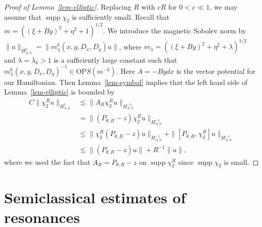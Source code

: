 \documentclass{article}
\theoremstyle{plain}
\theoremstyle{definition}
\theoremstyle{remark}
\newcommand{\supp}{\mathop{\mathrm{supp}}}
\begin{document}
\begin{proof}[Proof of Lemma~\ref{lem-elliptic}]
Replacing $R$ with $cR$ for $0<c\ll 1$, we may assume that $\supp \chi_2$ is sufficiently small. 
Recall that $m=((\xi+By)^2+\eta^2+1)^{1/2}$. 
We introduce the magnetic Sobolev norm by $\|u\|_{H_{A, h}^k}=\|m_{\lambda}^k(x, y, D_x, D_y)u\|$, where 
$m_{\lambda}=((\xi+By)^2+\eta^2+\lambda)^{1/2}$ and $\lambda=\lambda_k>1$ is a sufficiently large constant such that 
$m_{\lambda}^k(x, y, D_x, D_y)^{-1}\in \mathrm{OP}S(m^{-k})$. 
Here $A=-Bydx$ is the vector potential for our Hamiltonian.
Then Lemma~\ref{lem-symbol} implies that the left hand side of Lemma~\ref{lem-elliptic} is bounded by 
\begin{align*}
C\|\chi_2^R u\|_{H_{A, h}^1}&\lesssim \|A_R \chi_2^R u\|_{H_{A, h}^{-1}}\\
&= \|(P_{\theta, R}-z)\chi_2^R u\|_{H_{A, h}^{-1}} \\
&\le \|\chi_2^R(P_{\theta, R}-z)u\|_{H_{A, h}^{-1}}+\|[P_{\theta, R}, \chi_2^R]u\|_{H_{A, h}^{-1}} \\
&\lesssim \|(P_{\theta, R}-z)u\|+R^{-1}\|u\|, 
\end{align*}
where we used the fact that $A_R=P_{\theta, R}-z$ on $\supp \chi_2^R$ since $\supp \chi_2$  is small. 
\end{proof}





























\section{Semiclassical estimates of resonances}
\end{document}
